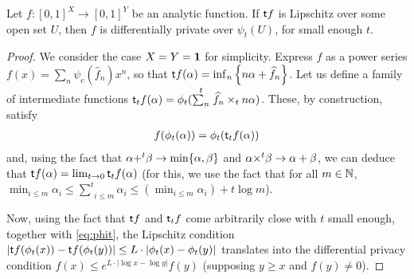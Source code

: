 %
%
\begin{proposition}
Let $f: [0,1]^{X}\to [0,1]^{Y}$ be an analytic function. If $\mathsf{t} f$ is Lipschitz over some open set $U$, then $f$ is differentially private over $\psi_{t}(U)$, for small enough $t$.
\end{proposition}
\begin{proof}
We consider the case $X=Y=\mathbf{1}$ for simplicity. 
Express $f$ as a power series $f(x)=\sum_{n}\psi_{e}(\widehat f_{n})x^{n}$, so that $\mathsf{t} f(\alpha)= \inf_{n}\left \{
n\alpha + \widehat f_{n}
\right\}$.
Let us define a family of intermediate functions $\mathsf{t} _{t}f(\alpha)=\phi_{t}(\stackrel{t}{\sum_{n}}\widehat{f}_{n}\times_{t}n\alpha)$. These, by construction, satisfy
\begin{align}\label{eq:phit}
f(\phi_{t}(\alpha)) = \phi_{t}(\trop_{t}f(\alpha))
\end{align}
and, using the fact that $\alpha{+}^{t}\beta\to\min\{\alpha,\beta\}$ and $\alpha{\times}^{t}\beta\to \alpha+\beta$, we can deduce that $\mathsf{t} f(\alpha)=\lim_{t\to 0}\mathsf{t} _{t}f(\alpha)$ (for this, we use the fact that for all $m\in \mathbb{N}$,
$\min_{i\leq m}\alpha_{i}\leq \stackrel{t}{\sum}_{i\leq m}\alpha_{i}\leq 
(\min_{i\leq m}\alpha_{i})+t\log m$).

Now, using the fact that $\mathsf{t} f$ and $\mathsf{t} _{t} f$ come arbitrarily close with $t$ small enough, together with \eqref{eq:phit}, the Lipschitz condition  
$|\mathsf{t} f(\phi_{t}(x))-\mathsf{t} f(\phi_{t}(y))|\leq L\cdot |\phi_{t}(x)-\phi_{t}(y)|$ translates into the differential privacy condition 
$f(x) \leq e^{L\cdot |\log x-\log y|} f(y)$ (supposing $y\geq x$ and $f(y)\neq 0$).
\end{proof}

%
%
%
%
%
%
%
%



